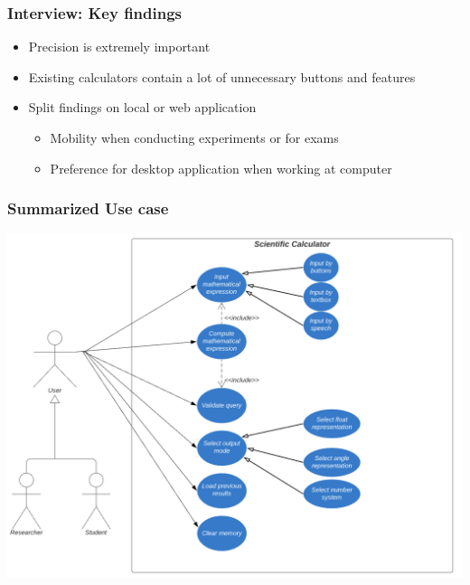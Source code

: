 \documentclass{beamer}
\begin{document}
\begin{frame}
\frametitle{Interview: Key findings}
\begin{itemize}
 \item Precision is extremely important
 \item Existing calculators contain a lot of unnecessary buttons and features
 \item Split findings on local or web application
  \begin{itemize}
   \item Mobility when conducting experiments or for exams
   \item Preference for desktop application when working at computer
  \end{itemize}
\end{itemize}
\end{frame}




\begin{frame}
\frametitle{Summarized Use case}
\includegraphics[scale=0.5]{Use Case}
\end{frame}
\end{document}
